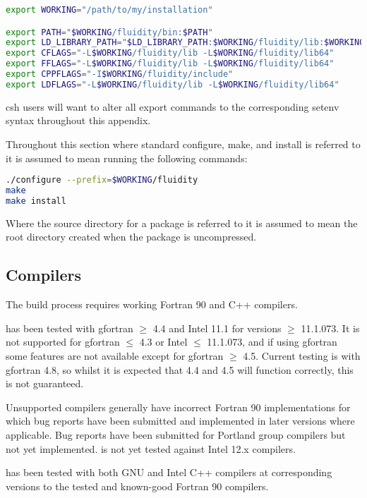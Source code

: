 \begin{lstlisting}[language=bash]
export WORKING="/path/to/my/installation"

export PATH="$WORKING/fluidity/bin:$PATH"
export LD_LIBRARY_PATH="$LD_LIBRARY_PATH:$WORKING/fluidity/lib:$WORKING/fluidity/lib64"
export CFLAGS="-L$WORKING/fluidity/lib -L$WORKING/fluidity/lib64"
export FFLAGS="-L$WORKING/fluidity/lib -L$WORKING/fluidity/lib64"
export CPPFLAGS="-I$WORKING/fluidity/include"
export LDFLAGS="-L$WORKING/fluidity/lib -L$WORKING/fluidity/lib64"
\end{lstlisting}

csh users will want to alter all export commands to the corresponding setenv
syntax throughout this appendix.

Throughout this section where standard configure, make, and install is referred
to it is assumed to mean running the following commands:

\begin{lstlisting}[language=bash]
./configure --prefix=$WORKING/fluidity
make
make install
\end{lstlisting}

Where the source directory for a package is referred to it is assumed to mean
the root directory created when the package is uncompressed.

\subsection{Compilers}
\label{sec:required_libraries_compilers}

The \fluidity build process requires working Fortran 90 and C++ compilers.

\fluidity has been tested with gfortran $\geq$ 4.4 and Intel 11.1 for versions
$\geq$ 11.1.073. It is not supported for gfortran $\leq$ 4.3 or Intel $\leq$
11.1.073, and if using gfortran some features are not available except for
gfortran $\geq$ 4.5. Current testing is with gfortran 4.8, so whilst it is
expected that 4.4 and 4.5 will function correctly, this is not guaranteed.

Unsupported compilers generally have incorrect Fortran 90 implementations for
which bug reports have been submitted and implemented in later versions where
applicable. Bug reports have been submitted for Portland group compilers but
not yet implemented. \fluidity is not yet tested against Intel 12.x compilers.

\fluidity has been tested with both GNU and Intel C++ compilers at corresponding
versions to the tested and known-good Fortran 90 compilers.

